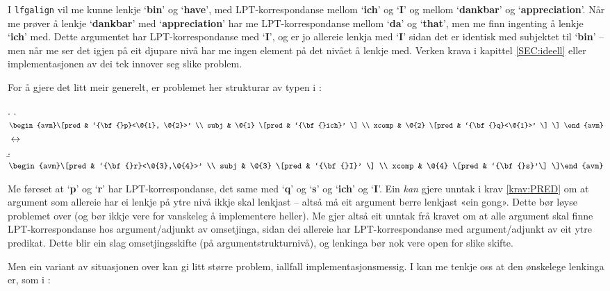 \documentclass[12pt,a4paper,oneside,draft]{report}
\newcommand{\p}[1]{`\textbf{#1}'}
\begin{document}
I \texttt{lfgalign} vil me kunne lenkje \p{bin} og \p{have}, med
 LPT\hyp{}korrespondanse mellom \p{ich} og \p{I} og mellom \p{dankbar} og
 \p{appreciation}. Når me prøver å lenkje \p{dankbar} med
 \p{appreciation} har me LPT\hyp{}korrespondanse mellom \p{da} og \p{that},
 men me finn ingenting å lenkje \p{ich} med. Dette argumentet har
 LPT\hyp{}korrespondanse med \p{I}, og er jo allereie lenkja med \p{I}
 sidan det er identisk med subjektet til \p{bin} -- men når me ser det
 igjen på eit djupare nivå har me ingen element på det nivået å lenkje
 med. Verken krava i kapittel \ref{SEC:ideell} eller implementasjonen
 av dei tek innover seg slike problem.

For å gjere det litt meir generelt, er problemet her strukturar av
 typen i \Next:

{\avmoptions{}
\ex. \a. $\begin{avm}\[pred & `{\bf{}p}<\@{1}, \@{2}>'  \\
     subj & \@{1} \[pred &  `{\bf{}ich}' \] \\
     xcomp & \@{2} \[pred & `{\bf{}q}<\@{1}>' \] \] \end{avm}$
     $\\\\\leftrightarrow$\\
     \b. $\begin{avm}\[pred & `{\bf{}r}<\@{3},\@{4}>' \\
     subj & \@{3} \[pred &  `{\bf{}I}' \]  \\
     xcomp & \@{4} \[pred & `{\bf{}s}'\] \]\end{avm}$

}

Me føreset at \p{p} og \p{r} har LPT\hyp{}korrespondanse, det same med
 \p{q} og \p{s} og \p{ich} og \p{I}. Ein \emph{kan} gjere unntak i krav
 \ref{krav:PRED} om at argument som allereie har ei lenkje på ytre
 nivå ikkje skal lenkjast -- altså må eit argument berre lenkjast «ein
 gong». Dette bør løyse problemet over (og bør ikkje vere for
 vanskeleg å implementere heller). Me gjer altså eit unntak frå kravet
 om at alle argument skal finne LPT\hyp{}korrespondanse hos
 argument/adjunkt av omsetjinga, sidan dei allereie har
 LPT\hyp{}korrespondanse med argument/adjunkt av eit ytre predikat. Dette
 blir ein slag omsetjingsskifte (på argumentstrukturnivå), og
 lenkinga bør nok vere open for slike skifte.

Men ein variant av situasjonen over kan gi litt større problem,
 iallfall implementasjonsmessig. I \NNext kan me tenkje oss at den
 ønskelege lenkinga er, som i \Last:
\end{document}
